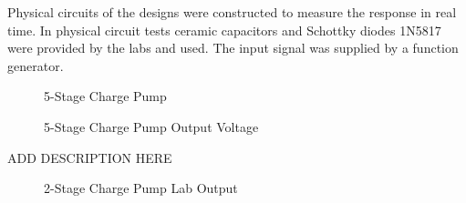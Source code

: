 \documentclass[12pt]{article}
\begin{document}
\noindent Physical circuits of the designs were constructed to measure the response in real time. In physical circuit tests ceramic capacitors and Schottky diodes 1N5817 were provided by the labs and used. The input signal was supplied by a function generator.

\begin{figure}[H]
\caption{5-Stage Charge Pump}
\label{fig:2SCP SR}
\end{figure}

\begin{figure}[H]
\caption{5-Stage Charge Pump Output Voltage}
\label{fig:2SCP SR Out}
\end{figure}

ADD DESCRIPTION HERE

\begin{figure}[H]
\caption{2-Stage Charge Pump Lab Output}
\label{fig:2SCP SR}
\end{figure}
\end{document}
